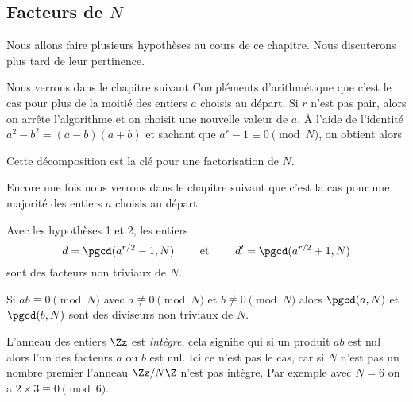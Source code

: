 \documentclass[11pt,class=report,crop=false]{standalone}
\begin{document}
\subsection{Facteurs de $N$}

Nous allons faire plusieurs hypothèses au cours de ce chapitre. Nous discuterons plus tard de leur pertinence.

\bigskip


\bigskip

Nous verrons dans le chapitre suivant \og{}Compléments d'arithmétique\fg{} que c'est le cas pour plus de la moitié des entiers $a$ choisis au départ.
Si $r$ n'est pas pair, alors on arrête l'algorithme et on choisit une nouvelle valeur de $a$.
À l'aide de l'identité $a^2-b^2 = (a-b)(a+b)$ et sachant que $a^r-1 \equiv 0 \pmod N$, on obtient alors 

Cette décomposition est la clé pour une factorisation de $N$.

\bigskip


\bigskip

Encore une fois nous verrons dans le chapitre suivant que c'est la cas pour une majorité des entiers $a$ choisis au départ.

\begin{proposition}
Avec les hypothèses 1 et 2, les entiers
$$d = \pgcd(a^{r/2}-1,N) \qquad \text{ et } \qquad d' = \pgcd(a^{r/2}+1,N)$$
sont des facteurs non triviaux de $N$.
\end{proposition}

\begin{lemme}
Si $ab \equiv 0 \pmod N$ avec $a \not\equiv 0 \pmod N$ et $b \not\equiv 0 \pmod N$ alors $\pgcd(a,N)$ et $\pgcd(b,N)$ sont des diviseurs non triviaux de $N$.
\end{lemme}

\begin{remarque*}
L'anneau des entiers $\Zz$ est \emph{intègre}, cela signifie qui si un produit $ab$ est nul alors l'un des facteurs $a$ ou $b$ est nul. Ici ce n'est pas le cas, car si $N$ n'est pas un nombre premier l'anneau $\Zz/N\Z$ n'est pas intègre. Par exemple avec $N=6$ on a 
$2 \times  3 \equiv 0 \pmod 6$.
\end{remarque*}
\end{document}

